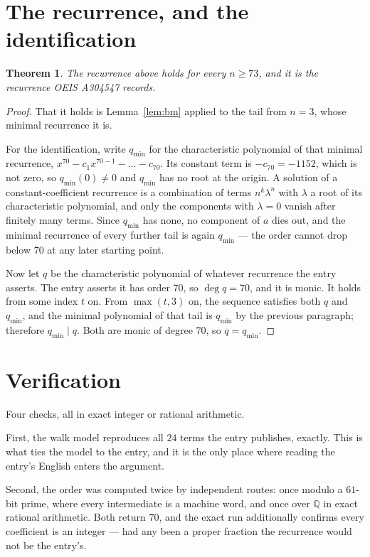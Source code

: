 \documentclass[11pt,a4paper]{article}
\theoremstyle{plain}
\newtheorem{theorem}{Theorem}
\theoremstyle{definition}
\begin{document}
\section{The recurrence, and the identification}

\begin{theorem}
The recurrence above holds for every $n\ge73$, and it is the recurrence OEIS A304547 records.
\end{theorem}

\begin{proof}
That it holds is Lemma~\ref{lem:bm} applied to the tail from $n=3$, whose minimal
recurrence it is.

For the identification, write $q_{\min}$ for the characteristic polynomial of that minimal
recurrence, $x^{70}-c_1x^{70-1}-\dots-c_{70}$. Its constant term is
$-c_{70}=-1152$, which is not zero, so $q_{\min}(0)\neq0$ and $q_{\min}$ has no
root at the origin. A solution of a constant-coefficient recurrence is a combination of terms
$n^{k}\lambda^{n}$ with $\lambda$ a root of its characteristic polynomial, and only the
components with $\lambda=0$ vanish after finitely many terms. Since $q_{\min}$ has none, no
component of $a$ dies out, and the minimal recurrence of every further tail is again
$q_{\min}$ --- the order cannot drop below $70$ at any later starting point.

Now let $q$ be the characteristic polynomial of whatever recurrence the entry asserts. The
entry asserts it has order $70$, so $\deg q=70$, and it is monic. It holds from some
index $t$ on. From $\max(t,3)$ on, the sequence satisfies both $q$ and $q_{\min}$, and
the minimal polynomial of that tail is $q_{\min}$ by the previous paragraph; therefore
$q_{\min}\mid q$. Both are monic of degree $70$, so $q=q_{\min}$.
\end{proof}

\section{Verification}

Four checks, all in exact integer or rational arithmetic.

First, the walk model reproduces all $24$ terms the entry publishes, exactly. This is
what ties the model to the entry, and it is the only place where reading the entry's English
enters the argument.

Second, the order was computed twice by independent routes: once modulo a $61$-bit prime, where
every intermediate is a machine word, and once over $\mathbb{Q}$ in exact rational arithmetic.
Both return $70$, and the exact run additionally confirms every coefficient is an integer
--- had any been a proper fraction the recurrence would not be the entry's.
\end{document}
